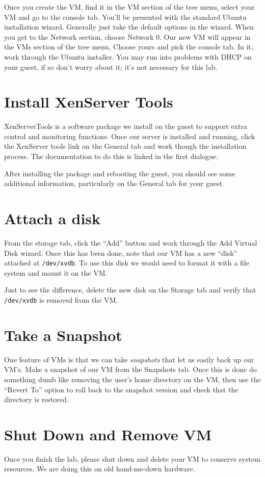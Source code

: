 \documentclass{article}
\begin{document}
 Once you create the VM, find it in the VM section of the tree menu, select your VM and go to the console tab. You'll be presented with the standard Ubuntu installation wizard. Generally just take the default options in the wizard. When you get to the Network section, choose Network 0.
 Our new VM will appear in the VMs section of the tree menu, Choose yours and pick the console tab. In it, work through 
 the Ubuntu installer. You may run into problems with DHCP on your guest, if so don't worry about it; it's not necessary
 for this lab.

\section{Install XenServer Tools}
XenServerTools is a software package we install on the guest to support extra control and monitoring functions. Once 
our server is installed and running, click the XenServer tools link on the General tab and work though the installation 
process. The documentation to do this is linked in the first dialogue.

After installing the package and rebooting the guest, you should see some additional information, particularly on the General tab for your guest.

\section{Attach a disk}
From the storage tab, click the ``Add'' button and work through the Add Virtual Disk wizard. Once this has been done,
note that our VM has a new ``disk'' attached at \texttt{/dev/xvdb}. To use this disk we would need to format it with a file 
system and mount it on the VM.

Just to see the difference, delete the new disk on the Storage tab and verify that \texttt{/dev/xvdb} is removed from the 
VM.


\section{Take a Snapshot}
One feature of VMs is that we can take \emph{snapshots} that let us easily back up our VM's. Make a snapshot of our VM from the Snapshots tab. Once this is done do something dumb like removing the user's home directory on the VM, then use the ``Revert To'' option to roll back to the snapshot version and check that the directory is restored.

\section{Shut Down and Remove VM}
Once you finish the lab, please shut down and delete your VM to conserve system resources. We are doing this on old
hand-me-down hardware.
\end{document}
